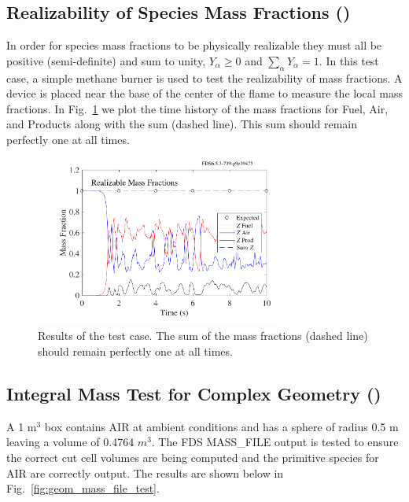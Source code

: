 \documentclass[11pt]{book}
\begin{document}
\subsection{Realizability of Species Mass Fractions (\texorpdfstring{}{realizable\_mass\_fractions})}
\label{realizable_mass_fractions}

In order for species mass fractions to be physically realizable they must all be positive (semi-definite) and sum to unity, $Y_\alpha\ge0$ and $\sum_\alpha Y_\alpha=1$.  In this test case, a simple methane burner is used to test the realizability of mass fractions.  A device is placed near the base of the center of the flame to measure the local mass fractions.  In Fig.~\ref{fig:realizable_mass_fractions} we plot the time history of the mass fractions for Fuel, Air, and Products along with the sum (dashed line).  This sum should remain perfectly one at all times.
\begin{figure}[ht]
\centering
\includegraphics[height=2.2in]{SCRIPT_FIGURES/realizable_mass_fractions}
\caption[The  test case]{Results of the  test case.  The sum of the mass fractions (dashed line) should remain perfectly one at all times.}
\label{fig:realizable_mass_fractions}
\end{figure}

\subsection{Integral Mass Test for Complex Geometry (\texorpdfstring{}{geom\_mass\_file\_test})}
\label{geom_mass_file_test}

A 1 m$^3$ box contains AIR at ambient conditions and has a sphere of radius 0.5 m leaving a volume of 0.4764 $m^3$.  The FDS {\ct MASS\_FILE} output is tested to ensure the correct cut cell volumes are being computed and the primitive species for AIR are correctly output.  The results are shown below in Fig.~\ref{fig:geom_mass_file_test}.
\end{document}
